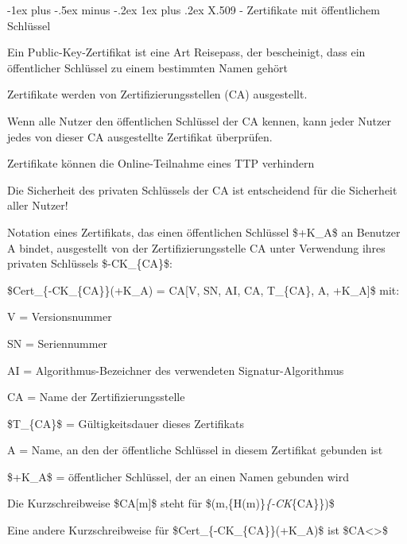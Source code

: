 \documentclass[a4paper]{article}
\makeatletter
\renewcommand{\subsubsection}{\@startsection{subsubsection}{3}{0mm}%
 {-1ex plus -.5ex minus -.2ex}%
 {1ex plus .2ex}%
 {\normalfont\small\bfseries}}
\makeatother
\begin{document}
\begin{multicols}{3}
      \subsubsection{X.509 - Zertifikate mit öffentlichem
            Schlüssel}


      \begin{itemize*}
            \item
            Ein Public-Key-Zertifikat ist eine Art Reisepass, der bescheinigt,
            dass ein öffentlicher Schlüssel zu einem bestimmten Namen gehört
            \item
            Zertifikate werden von Zertifizierungsstellen (CA) ausgestellt.
            \item
            Wenn alle Nutzer den öffentlichen Schlüssel der CA kennen, kann jeder
            Nutzer jedes von dieser CA ausgestellte Zertifikat überprüfen.
            \item
            Zertifikate können die Online-Teilnahme eines TTP verhindern
            \item
            Die Sicherheit des privaten Schlüssels der CA ist entscheidend für die
            Sicherheit aller Nutzer!
            \item
            Notation eines Zertifikats, das einen öffentlichen Schlüssel \$+K\_A\$
            an Benutzer A bindet, ausgestellt von der Zertifizierungsstelle CA
            unter Verwendung ihres privaten Schlüssels \$-CK\_\{CA\}\$:

            \begin{itemize*}
                  \item \$Cert\_\{-CK\_\{CA\}\}(+K\_A) = CA{[}V, SN, AI, CA, T\_\{CA\}, A, +K\_A{]}\$ mit:
                  \begin{itemize*} \item V = Versionsnummer \item SN = Seriennummer \item AI = Algorithmus-Bezeichner des verwendeten Signatur-Algorithmus \item CA = Name der Zertifizierungsstelle \item \$T\_\{CA\}\$ = Gültigkeitsdauer dieses Zertifikats \item A = Name, an den der öffentliche Schlüssel in diesem Zertifikat gebunden ist \item \$+K\_A\$ = öffentlicher Schlüssel, der an einen Namen gebunden wird \end{itemize*}
                  \item Die Kurzschreibweise \$CA{[}m{]}\$ steht für \$(m,\{H(m)\}\emph{\{-CK}\{CA\}\})\$
                  \item Eine andere Kurzschreibweise für \$Cert\_\{-CK\_\{CA\}\}(+K\_A)\$ ist \$CA\textless{}\textgreater\$
            \end{itemize*}
      \end{itemize*}



\end{multicols}
\end{document}
